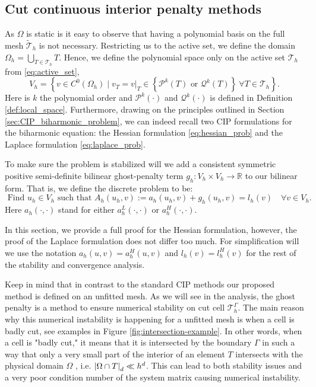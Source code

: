 \subsection{Cut continuous interior penalty methods }%
\label{sub:cut_cip_method}

As $\Omega $ is static is it easy to observe that having a polynomial basis on the full mesh $\widetilde{\mathcal{T}}_{h}$ is not necessary. Restricting us to the active set, we define the domain $\Omega _{h} = \bigcup _{T \in \mathcal{T} _{h}} T$.
Hence, we define the polynomial space only on the active set $\mathcal{T}_{h} $ from \eqref{eq:active_set},
\begin{equation}
V_{h} = \left\{ v \in C^{0}( \Omega _{h}  )  \mid  v_{T} = v | _{T} \in \left\{ \mathcal{P} ^{k} ( T ) \text{ or } \mathcal{Q} ^{k}( T ) \right\}  \  \forall T \in
\mathcal{T}_{h}    \right\}.
\end{equation}
Here is $k$ the polynomial order and $\mathcal{P}^{k}( \cdot  )  $ and $\mathcal{Q} ^{k}( \cdot ) $ is defined in Definition \ref{def:local_space}.
Furthermore, drawing on the principles outlined in Section \ref{sec:CIP_biharmonic_problem}, we can indeed recall two CIP formulations for the biharmonic equation: the Hessian formulation \eqref{eq:hessian_prob} and the Laplace formulation \eqref{eq:laplace_prob}.

To make sure the problem is stabilized will we add a consistent symmetric positive semi-definite bilinear ghost-penalty term  $g_{h}: V_{h} \times  V_{h} \to \mathbb{R} $ to our bilinear form. That is, we define the discrete problem to be:
\begin{equation}
\label{eq:discrete_CutCIP_prob}
\text{ Find } u_{h} \in V_{h}  \text{ such that }    A_{h}( u_{h} ,v ) := a_{h}( u_{h}, v)  + g_{h}( u_{h},v) = l_{h} ( v) \quad  \forall v \in  V_{h}.
\end{equation}
Here $a_{h}( \cdot,\cdot  ) $ stand for either $a_{h}^{L}( \cdot ,\cdot ) $ or $a_{h}^{H}( \cdot ,\cdot ) $.

In this section, we provide a full proof for the Hessian formulation, however, the proof of the Laplace formulation does not differ too much. For simplification will we use the notation $a_{h}(u,v ) = a_{h}^{H}( u,v)$ and $l_{h}(v) =l_{h}^{H}(v)$ for the rest of the stability and convergence analysis.

Keep in mind that in contrast to the standard CIP methods our proposed method is defined on an unfitted mesh. As we will see in the analysis, the ghost penalty is a method to ensure numerical stability on cut cell $\mathcal{T} ^{\Gamma }_{h}$. The main reason why
this numerical instability is happening for a unfitted mesh is when a cell is badly cut, see examples in Figure \ref{fig:intersection-example}.
In other words, when a cell is "badly cut," it means that it is intersected by the boundary $\Gamma$ in such a way that only a very small part of the interior of an element $T$  intersects with the physical domain $\Omega $ , i.e. $\left\lvert  \Omega \cap
T  \right\rvert_{d} \ll h^{d}$. This can lead to both stability issues and a very poor condition number of the system matrix causing numerical instability.

